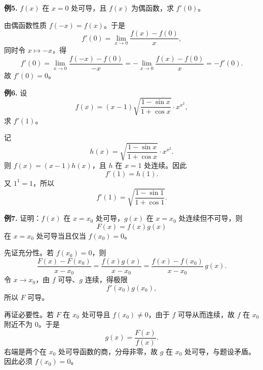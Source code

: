 \begin{problemblock}
\textbf{例5.} \(f(x)\) 在 \(x=0\) 处可导，且 \(f(x)\) 为偶函数，求 \(f'(0)\)。
\end{problemblock}
\begin{solutionblock}
由偶函数性质 \(f(-x)=f(x)\)。于是
\[
f'(0)=\lim_{x\to0}\frac{f(x)-f(0)}x,
\]
同时令 \(x\mapsto -x\)，得
\[
f'(0)=\lim_{x\to0}\frac{f(-x)-f(0)}{-x}
=-\lim_{x\to0}\frac{f(x)-f(0)}x=-f'(0).
\]
故 \(f'(0)=0\)。
\end{solutionblock}

\begin{problemblock}
\textbf{例6.} 设
\[
f(x)=(x-1)\sqrt{\frac{1-\sin x}{1+\cos x}}\cdot x^{x^2},
\]
求 \(f'(1)\)。
\end{problemblock}
\begin{solutionblock}
记
\[
h(x)=\sqrt{\frac{1-\sin x}{1+\cos x}}\cdot x^{x^2}.
\]
则 \(f(x)=(x-1)h(x)\)，且 \(h\) 在 \(x=1\) 处连续。因此
\[
f'(1)=h(1).
\]
又 \(1^{1}=1\)，所以
\[
f'(1)=\sqrt{\frac{1-\sin 1}{1+\cos 1}}.
\]
\end{solutionblock}

\begin{problemblock}
\textbf{例7.} 证明：\(f(x)\) 在 \(x=x_0\) 处可导，\(g(x)\) 在 \(x=x_0\) 处连续但不可导，则
\[
F(x)=f(x)g(x)
\]
在 \(x=x_0\) 处可导当且仅当 \(f(x_0)=0\)。
\end{problemblock}
\begin{solutionblock}
先证充分性。若 \(f(x_0)=0\)，则
\[
\frac{F(x)-F(x_0)}{x-x_0}
=\frac{f(x)g(x)}{x-x_0}
=\frac{f(x)-f(x_0)}{x-x_0}\,g(x).
\]
令 \(x\to x_0\)，由 \(f\) 可导、\(g\) 连续，得极限
\[
f'(x_0)g(x_0),
\]
所以 \(F\) 可导。

再证必要性。若 \(F\) 在 \(x_0\) 处可导且 \(f(x_0)\ne0\)，由于 \(f\) 可导从而连续，故 \(f\) 在 \(x_0\) 附近不为 0。于是
\[
g(x)=\frac{F(x)}{f(x)}.
\]
右端是两个在 \(x_0\) 处可导函数的商，分母非零，故 \(g\) 在 \(x_0\) 处可导，与题设矛盾。因此必须 \(f(x_0)=0\)。
\end{solutionblock}

